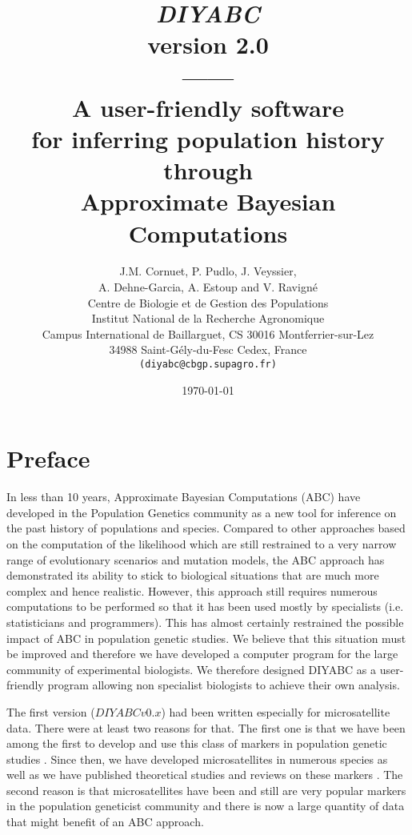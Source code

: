 \documentclass [a4paper]{report}
\title{\Huge \emph{\textbf{DIYABC}} \\ version 2.0\\------\\ A user-friendly software \\  for inferring population history  through \\ Approximate Bayesian Computations}
\author{\vspace{1.0 cm}\Large J.M. Cornuet, P. Pudlo, J. Veyssier,\\ A. Dehne-Garcia, A. Estoup and V. Ravign\'e\\
\vspace{6.0cm}
Centre de Biologie et de Gestion des Populations\\
Institut National de la Recherche Agronomique\\
Campus International de Baillarguet, CS 30016 Montferrier-sur-Lez\\
34988 Saint-G\'ely-du-Fesc Cedex, France\\
\texttt{(diyabc@cbgp.supagro.fr)}}
\date{\today}
\let\sectionv\section
\renewcommand{\section}[1]{\sectionv{#1} \setcounter{paragraph}{0}}
\begin{document}
\maketitle %
\pagestyle{myheadings}
\begin{doublespacing}
\tableofcontents
\end{doublespacing}
\newpage
\section{Preface}
In less than 10 years, Approximate Bayesian Computations (ABC) have developed in the Population Genetics community as a new tool for inference on the past history of populations and species. Compared to other approaches based on the computation of the likelihood which are still restrained to a very narrow range of evolutionary scenarios and mutation models, the ABC approach has demonstrated its ability to stick to biological situations that are much more complex and hence realistic. However, this approach still requires numerous computations to be performed so that it has been used mostly by specialists (i.e. statisticians and programmers). This has almost certainly restrained the possible impact of ABC in population genetic studies. We believe that this situation must be improved and therefore we have developed a computer program for the large community of experimental biologists. We therefore designed DIYABC as a user-friendly program allowing non specialist biologists to achieve their own analysis.\

The first version ($DIYABC v0.x$) had been written especially for microsatellite data. There were at least two reasons for that. The first one is that we have been among the first to develop and use this class of markers in population genetic studies \citep[e.g.][]{E1993}. Since then, we have developed microsatellites in numerous species as well as we have published theoretical studies and reviews on these markers \citep[e.g.][]{E2002}. The second reason is that microsatellites have been and still are very popular markers in the population geneticist community and there is now a large quantity of data that might benefit of an ABC approach.\
\end{document}
